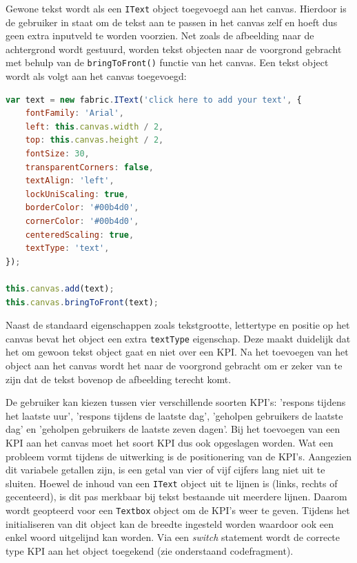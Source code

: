 
Gewone tekst wordt als een \texttt{IText} object toegevoegd aan het canvas. Hierdoor is de gebruiker in staat om de tekst aan te passen in het canvas zelf en hoeft dus geen extra inputveld te worden voorzien. Net zoals de afbeelding naar de achtergrond wordt gestuurd, worden tekst objecten naar de voorgrond gebracht met behulp van de \texttt{bringToFront()} functie van het canvas. Een tekst object wordt als volgt aan het canvas toegevoegd:

\begin{lstlisting}[language=javascript]
var text = new fabric.IText('click here to add your text', {
	fontFamily: 'Arial',
	left: this.canvas.width / 2,
	top: this.canvas.height / 2,
	fontSize: 30,
	transparentCorners: false,
	textAlign: 'left',
	lockUniScaling: true,
	borderColor: '#00b4d0',
	cornerColor: '#00b4d0',
	centeredScaling: true,
	textType: 'text',
});

this.canvas.add(text);
this.canvas.bringToFront(text);
\end{lstlisting}

Naast de standaard eigenschappen zoals tekstgrootte, lettertype en positie op het canvas bevat het object een extra \texttt{textType} eigenschap. Deze maakt duidelijk dat het om gewoon tekst object gaat en niet over een KPI. Na het toevoegen van het object aan het canvas wordt het naar de voorgrond gebracht om er zeker van te zijn dat de tekst bovenop de afbeelding terecht komt. 

De gebruiker kan kiezen tussen vier verschillende soorten KPI's: 'respons tijdens het laatste uur', 'respons tijdens de laatste dag', 'geholpen gebruikers de laatste dag' en 'geholpen gebruikers de laatste zeven dagen'. Bij het toevoegen van een KPI aan het canvas moet het soort KPI dus ook opgeslagen worden.%
Wat een probleem vormt tijdens de uitwerking is de positionering van de KPI's. Aangezien dit variabele getallen zijn, is een getal van vier of vijf cijfers lang niet uit te sluiten. Hoewel de inhoud van een \texttt{IText} object uit te lijnen is (links, rechts of gecenteerd), is dit pas merkbaar bij tekst bestaande uit meerdere lijnen. Daarom wordt geopteerd voor een \texttt{Textbox} object om de KPI's weer te geven. Tijdens het initialiseren van dit object kan de breedte ingesteld worden waardoor ook een enkel woord uitgelijnd kan worden. Via een \textit{switch} statement wordt de correcte type KPI aan het object toegekend (zie onderstaand codefragment). 

